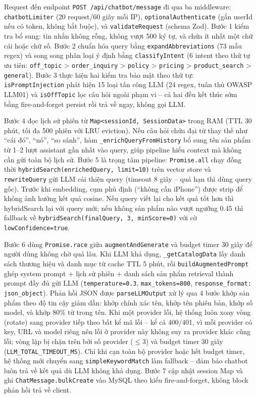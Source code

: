 Request đến endpoint \texttt{POST /api/chatbot/message} đi qua ba middleware: \texttt{chatbotLimiter} (20 request/60 giây mỗi IP), \texttt{optionalAuthenticate} (gắn userId nếu có token, không bắt buộc), và \texttt{validateRequest} (schema Zod). Bước 1 kiểm tra bổ sung: tin nhắn không rỗng, không vượt 500 ký tự, và chứa ít nhất một chữ cái hoặc chữ số. Bước 2 chuẩn hóa query bằng \texttt{expandAbbreviations} (73 mẫu regex) và song song phân loại ý định bằng \texttt{classifyIntent} (6 intent theo thứ tự ưu tiên: \texttt{off\_topic} > \texttt{order\_inquiry} > \texttt{policy} > \texttt{pricing} > \texttt{product\_search} > \texttt{general}). Bước 3 thực hiện hai kiểm tra bảo mật theo thứ tự: \texttt{isPromptInjection} phát hiện 15 loại tấn công LLM (24 regex, tuân thủ OWASP LLM01) và \texttt{isOffTopic} lọc câu hỏi ngoài phạm vi -- cả hai đều kết thúc sớm bằng fire-and-forget persist rồi trả về ngay, không gọi LLM.

Bước 4 đọc lịch sử phiên từ \texttt{Map<sessionId, SessionData>} trong RAM (TTL 30 phút, tối đa 500 phiên với LRU eviction). Nếu câu hỏi chứa đại từ thay thế như ``cái đó'', ``nó'', ``so sánh'', hàm \texttt{\_enrichQueryFromHistory} bổ sung tên sản phẩm từ 1--2 lượt assistant gần nhất vào query, giúp pipeline hiểu context mà không cần gửi toàn bộ lịch sử. Bước 5 là trọng tâm pipeline: \texttt{Promise.all} chạy đồng thời \texttt{hybridSearch(enrichedQuery, limit=10)} trên vector store và \texttt{rewriteQuery} gửi LLM cải thiện query (timeout 8 giây -- quá hạn thì dùng query gốc). Trước khi embedding, cụm phủ định (``không cần iPhone'') được strip để không ảnh hưởng kết quả cosine. Nếu query viết lại cho kết quả tốt hơn thì hybridSearch lại với query mới; nếu không sản phẩm nào vượt ngưỡng 0.45 thì fallback về \texttt{hybridSearch(finalQuery, 3, minScore=0)} với cờ \texttt{lowConfidence=true}.

Bước 6 dùng \texttt{Promise.race} giữa \texttt{augmentAndGenerate} và budget timer 30 giây để người dùng không chờ quá lâu. Khi LLM khả dụng, \texttt{\_getCatalogData} lấy danh sách thương hiệu và danh mục từ cache TTL 5 phút, rồi \texttt{buildAugmentedPrompt} ghép system prompt + lịch sử phiên + danh sách sản phẩm retrieval thành prompt đầy đủ gửi LLM (\texttt{temperature=0.3}, \texttt{max\_tokens=800}, \texttt{response\_format: json\_object}). Phản hồi JSON được \texttt{parseLLMOutput} xử lý qua 4 bước khớp sản phẩm theo độ tin cậy giảm dần: khớp chính xác tên, khớp tên phiên bản, khớp số model, và khớp 80\% từ trong tên. Khi một provider lỗi, hệ thống luôn xoay vòng (rotate) sang provider tiếp theo bất kể mã lỗi -- kể cả 400/401, vì mỗi provider có key, URL và model riêng nên lỗi ở provider này không suy ra provider khác cũng lỗi; vòng lặp bị chặn trên bởi số provider ($\leq$3) và budget timer 30 giây (\texttt{LLM\_TOTAL\_TIMEOUT\_MS}). Chỉ khi cạn toàn bộ provider hoặc hết budget timer, hệ thống mới chuyển sang \texttt{simpleKeywordMatch} làm fallback -- đảm bảo chatbot luôn trả về kết quả dù LLM không khả dụng. Bước 7 cập nhật session Map và ghi \texttt{ChatMessage.bulkCreate} vào MySQL theo kiểu fire-and-forget, không block phản hồi trả về client.


